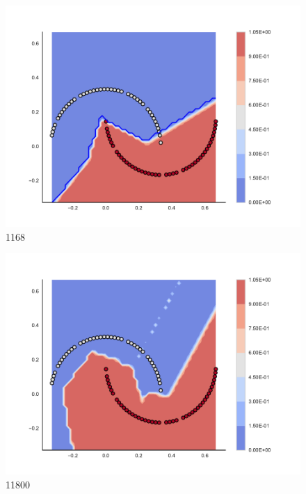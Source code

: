 \begin{subfigure}[b]{0.09\textwidth}
    \includegraphics[width=\textwidth]{img/convergence/1168.pdf}
    \caption{1168}
    \label{fig:convergence_1168}
\end{subfigure}
%
\begin{subfigure}[b]{0.09\textwidth}
    \includegraphics[width=\textwidth]{img/convergence/11800.pdf}
    \caption{11800}
    \label{fig:convergence_11800}
\end{subfigure}
%
